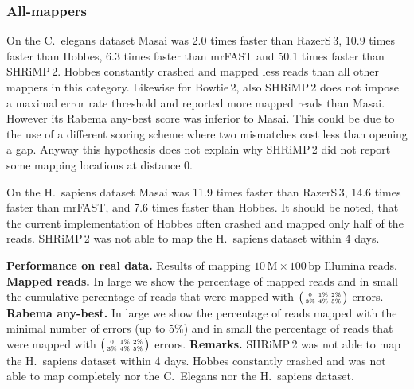 \subsubsection{All-mappers}
On the C.~elegans dataset Masai was 2.0 times faster than RazerS\,3, 10.9 times faster than Hobbes, 6.3 times faster than mrFAST and 50.1 times faster than SHRiMP\,2.
Hobbes constantly crashed and mapped less reads than all other mappers in this category.
Likewise for Bowtie\,2, also SHRiMP\,2 does not impose a maximal error rate threshold and reported more mapped reads than Masai.
However its Rabema any-best score was inferior to Masai.
This could be due to the use of a different scoring scheme where two mismatches cost less than opening a gap.
Anyway this hypothesis does not explain why SHRiMP\,2 did not report some mapping locations at distance 0.

On the H.~sapiens dataset Masai was 11.9 times faster than RazerS\,3, 14.6 times faster than mrFAST, and 7.6 times faster than Hobbes. It  should be noted, that the current implementation of Hobbes often crashed and mapped only half of the reads.
SHRiMP\,2 was not able to map the H.~sapiens dataset within 4 days.

\begin{table*}[t]
  \caption[Performance on real data]{
    \label{tab:Runtime}
    \textbf{Performance on real data.}
	Results of mapping $10\,\text{M}\times 100\,\text{bp}$ Illumina reads.
	\textbf{Mapped reads.}
	In large we show the percentage of mapped reads and in small the cumulative percentage of reads that were mapped with $\bigl(\begin{smallmatrix}\mbox{\tiny 0}&\mbox{\tiny 1\%}&\mbox{\tiny 2\%}\\\mbox{\tiny 3\%}&\mbox{\tiny 4\%}&\mbox{\tiny 5\%}\end{smallmatrix}\bigr)$ errors.
	\textbf{Rabema any-best.}
    In large we show the percentage of reads mapped with the minimal number of errors (up to 5\%) and in small the percentage of reads that were mapped with $\bigl(\begin{smallmatrix}\mbox{\tiny 0}&\mbox{\tiny 1\%}&\mbox{\tiny 2\%}\\\mbox{\tiny 3\%}&\mbox{\tiny 4\%}&\mbox{\tiny 5\%}\end{smallmatrix}\bigr)$ errors.
	\textbf{Remarks.}
    SHRiMP\,2 was not able to map the H.~sapiens dataset within 4 days.
    Hobbes constantly crashed and was not able to map completely nor the C.~Elegans nor the H.~sapiens dataset.
  }
	\vspace{-3mm}
	\center
	\sffamily
	\resizebox{1.0\textwidth}{!}
	{
		\renewcommand{\tabcolsep}{0.8ex}
		
	}
\end{table*}


